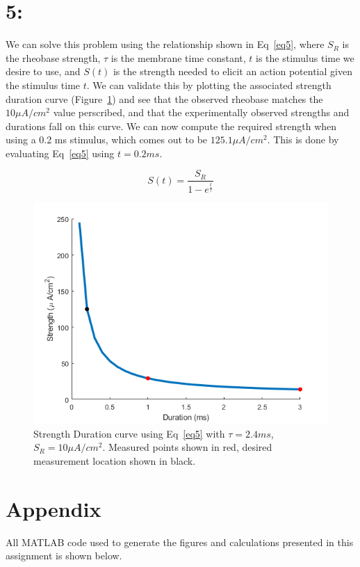 \documentclass[12pt]{article}
\begin{document}
\section{5: }
We can solve this problem using the relationship shown in Eq~\ref{eq5}, where $S_R$ is the rheobase strength, $\tau$ is the membrane time constant, $t$ is the stimulus time we desire to use, and $S(t)$ is the strength needed to elicit an action potential given the stimulus time $t$. We can validate this by plotting the associated strength duration curve (Figure~\ref{Fig:strdur}) and see that the observed rheobase matches the $10 \mu A/cm^2$ value perscribed, and that the experimentally observed strengths and durations fall on this curve. We can now compute the required strength when using a 0.2 ms stimulus, which comes out to be $125.1 \mu A/cm^2$. This is done by evaluating Eq~\ref{eq5} using $t = 0.2ms$.

\begin{equation}
S(t) = \frac{S_R}{1-e^\frac{t}{\tau}}
\label{eq5}
\end{equation}

\begin{figure}[H]
	
	\centering
	\includegraphics[width=.95\textwidth]{Figures/StrDur.png}
	
	\caption{Strength Duration curve using Eq~\ref{eq5} with $\tau = 2.4 ms$, $S_R = 10 \mu A/cm^2$. Measured points shown in red, desired measurement location shown in black.}
	\label{Fig:strdur}
\end{figure}

\section{Appendix}
All MATLAB code used to generate the figures and calculations presented in this assignment is shown below.
\end{document}
